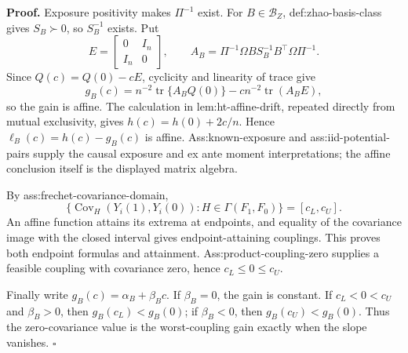 \textbf{Proof.}
Exposure positivity makes \(\Pi^{-1}\) exist.  For \(B\in\mathcal B_Z\), def:zhao-basis-class gives \(S_B\succ0\), so \(S_B^{-1}\) exists.  Put
\[
 E=\begin{bmatrix}0&I_n\\I_n&0\end{bmatrix},
 \qquad A_B=\Pi^{-1}\Omega BS_B^{-1}B^{\top}\Omega\Pi^{-1}.
\]
Since \(Q(c)=Q(0)-cE\), cyclicity and linearity of trace give
\[
 g_B(c)=n^{-2}\operatorname{tr}\{A_BQ(0)\}
 -cn^{-2}\operatorname{tr}(A_BE),
\]
so the gain is affine.  The calculation in lem:ht-affine-drift, repeated directly from mutual exclusivity, gives \(h(c)=h(0)+2c/n\).  Hence \(\ell_B(c)=h(c)-g_B(c)\) is affine.  Ass:known-exposure and ass:iid-potential-pairs supply the causal exposure and ex ante moment interpretations; the affine conclusion itself is the displayed matrix algebra.

By ass:frechet-covariance-domain,
\[
 \{\operatorname{Cov}_H(Y_i(1),Y_i(0)):H\in\Gamma(F_1,F_0)\}=[c_L,c_U].
\]
An affine function attains its extrema at endpoints, and equality of the covariance image with the closed interval gives endpoint-attaining couplings.  This proves both endpoint formulas and attainment.  Ass:product-coupling-zero supplies a feasible coupling with covariance zero, hence \(c_L\le0\le c_U\).

Finally write \(g_B(c)=\alpha_B+\beta_Bc\).  If \(\beta_B=0\), the gain is constant.  If \(c_L<0<c_U\) and \(\beta_B>0\), then \(g_B(c_L)<g_B(0)\); if \(\beta_B<0\), then \(g_B(c_U)<g_B(0)\).  Thus the zero-covariance value is the worst-coupling gain exactly when the slope vanishes. \(\square\)